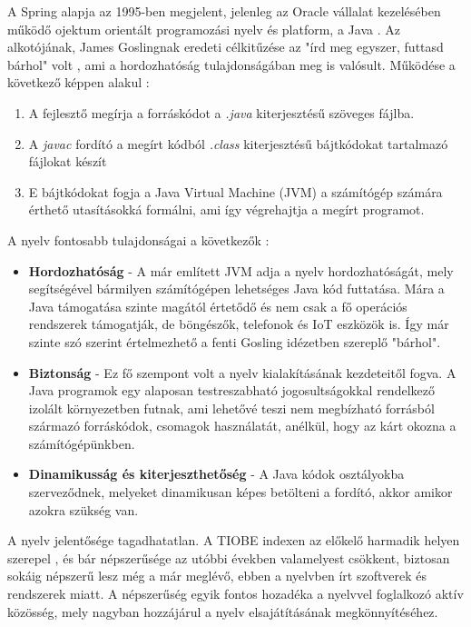 \documentclass[12pt]{article}
\begin{document}
A Spring alapja az 1995-ben megjelent, jelenleg az Oracle vállalat kezelésében működő ojektum orientált programozási nyelv és platform, a Java \cite{JAVA_ABOUT}. Az alkotójának, James Goslingnak eredeti célkitűzése az "írd meg egyszer, futtasd bárhol" volt \cite{JAVA_BOOK}, ami a hordozhatóság tulajdonságában meg is valósult. Működése a következő képpen alakul \cite{ORACLE_JAVA}:
\begin{enumerate}
\item A fejlesztő megírja a forráskódot a \textit{.java} kiterjesztésű szöveges fájlba.
\item A \textit{javac} fordító a megírt kódból \textit{.class} kiterjesztésű bájtkódokat tartalmazó fájlokat készít
\item E bájtkódokat fogja a Java Virtual Machine (JVM) a számítógép számára érthető utasításokká formálni, ami így végrehajtja a megírt programot.
\end{enumerate}

A nyelv fontosabb tulajdonságai a következők \cite{JAVA_BOOK}:
\begin{itemize}
	\item[]\textbf{Hordozhatóság}
	- A már említett JVM adja a nyelv hordozhatóságát, mely segítségével bármilyen számítógépen lehetséges Java kód futtatása. Mára a Java támogatása szinte magától értetődő és nem csak a fő operációs rendszerek támogatják, de böngészők, telefonok és IoT eszközök is. Így már szinte szó szerint értelmezhető a fenti Gosling idézetben szereplő "bárhol".
	\item[]\textbf{Biztonság}
	- Ez fő szempont volt a nyelv kialakításának kezdeteitől fogva. A Java programok egy alaposan testreszabható jogosultságokkal rendelkező izolált környezetben futnak, ami lehetővé teszi nem megbízható forrásból származó forráskódok, csomagok használatát, anélkül, hogy az kárt okozna a számítógépünkben.
	\item[]\textbf{Dinamikusság és kiterjeszthetőség}
	- A Java kódok osztályokba szerveződnek, melyeket dinamikusan képes betölteni a fordító, akkor amikor azokra szükség van.
\end{itemize}

A nyelv jelentősége tagadhatatlan. A TIOBE indexen az előkelő harmadik helyen szerepel \cite{TIO}, és bár népszerűsége az utóbbi években valamelyest csökkent, biztosan sokáig népszerű lesz még a már meglévő, ebben a nyelvben írt szoftverek és rendszerek miatt. A népszerűség egyik fontos hozadéka a nyelvvel foglalkozó aktív közösség, mely nagyban hozzájárul a nyelv elsajátításának megkönnyítéséhez.
\end{document}
